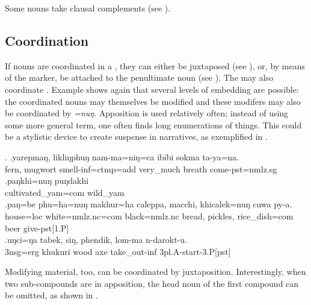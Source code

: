 Some nouns take clausal complements (see ).

\subsection{Coordination}\label{str-np-coord}

If nouns are coordinated in a , they can either be juxtaposed (see \Next[a]), or, by means of the   marker, be attached to the penultimate noun (see \Next[b]). The  may also coordinate . Example \Next[c] shows again that several levels of embedding are possible: the coordinated nouns may themselves be modified and these modifers may also be coordinated by \emph{=nuŋ}. Apposition is used relatively often; instead of using some more general term, one often finds long enumerations of things. This could be a stylistic device to create suspense in narratives, as exemplified in \Next[d].

\ex. \ag.yarepmaŋ, likliŋphuŋ nam-ma=niŋ=ca   ibibi     sokma  ta-ya=na.\\
fern, mugwort smell{\sc -inf=ctmp=add} very\_much breath come{\sc [3sg]-pst=nmlz.sg}\\
 
\bg.paŋkhi=nuŋ   puŋdakhi     \\
cultivated\_yam{\sc =com} wild\_yam\\
 
\bg.paŋ=be     phu=ha=nuŋ      makhur=ha         caleppa, macchi,  khicalek=nuŋ      cuwa py-a.\\
house{\sc =loc} white{\sc =nmlz.nc=com}  black{\sc =nmlz.nc} bread, pickles, rice\_dish{\sc =com} beer give{\sc -pst[1.P]}\\
 
\bg.uŋci=ŋa   tabek,   siŋ,     phendik, lom-ma         n-darokt-u.\\
{\sc 3nsg=erg} khukuri wood axe take\_out{\sc -inf} {\sc 3pl.A-}start{\sc -3.P[pst]}\\
 

Modifying material, too, can be coordinated by juxtaposition. Interestingly, when two sub-compounds are in apposition, the head noun of the first compound can be omitted, as shown in \Next[c].

